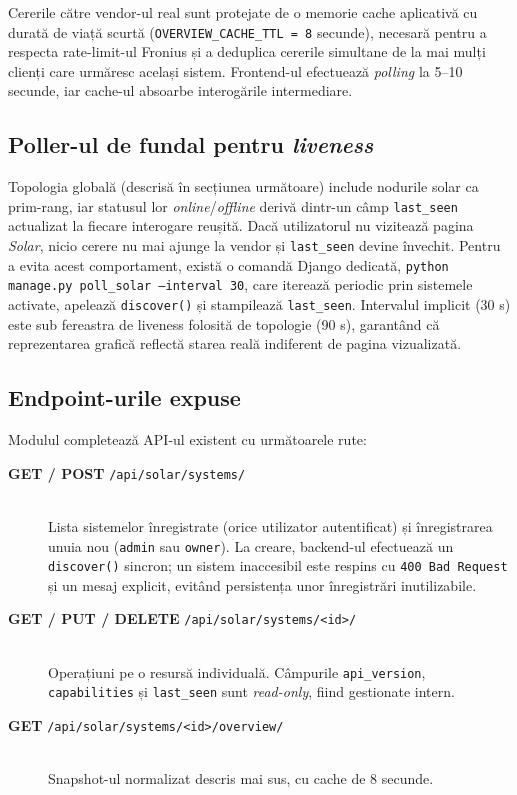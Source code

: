 Cererile către vendor-ul real sunt protejate de o memorie cache aplicativă cu durată de viață scurtă (\texttt{OVERVIEW\_CACHE\_TTL = 8} secunde), necesară pentru a respecta rate-limit-ul Fronius și a deduplica cererile simultane de la mai mulți clienți care urmăresc același sistem. Frontend-ul efectuează \textit{polling} la 5--10 secunde, iar cache-ul absoarbe interogările intermediare.

\subsection{Poller-ul de fundal pentru \emph{liveness}}
Topologia globală (descrisă în secțiunea următoare) include nodurile solar ca prim-rang, iar statusul lor \emph{online}/\emph{offline} derivă dintr-un câmp \texttt{last\_seen} actualizat la fiecare interogare reușită. Dacă utilizatorul nu vizitează pagina \emph{Solar}, nicio cerere nu mai ajunge la vendor și \texttt{last\_seen} devine învechit. Pentru a evita acest comportament, există o comandă Django dedicată, \texttt{python manage.py poll\_solar --interval 30}, care iterează periodic prin sistemele activate, apelează \texttt{discover()} și stampilează \texttt{last\_seen}. Intervalul implicit (30 s) este sub fereastra de liveness folosită de topologie (90 s), garantând că reprezentarea grafică reflectă starea reală indiferent de pagina vizualizată.

\subsection{Endpoint-urile expuse}
Modulul completează API-ul existent cu următoarele rute:
\begin{description}
    \item[\textbf{GET / POST} \texttt{/api/solar/systems/}] \hfill \\
    Lista sistemelor înregistrate (orice utilizator autentificat) și înregistrarea unuia nou (\texttt{admin} sau \texttt{owner}). La creare, backend-ul efectuează un \texttt{discover()} sincron; un sistem inaccesibil este respins cu \texttt{400 Bad Request} și un mesaj explicit, evitând persistența unor înregistrări inutilizabile.
    \item[\textbf{GET / PUT / DELETE} \texttt{/api/solar/systems/<id>/}] \hfill \\
    Operațiuni pe o resursă individuală. Câmpurile \texttt{api\_version}, \texttt{capabilities} și \texttt{last\_seen} sunt \emph{read-only}, fiind gestionate intern.
    \item[\textbf{GET} \texttt{/api/solar/systems/<id>/overview/}] \hfill \\
    Snapshot-ul normalizat descris mai sus, cu cache de 8 secunde.
\end{description}

